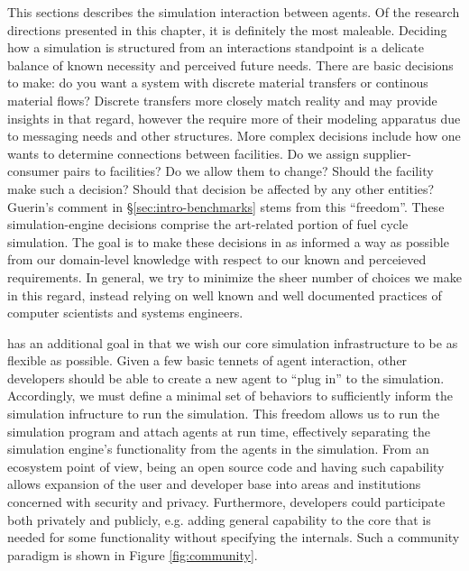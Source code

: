 This sections describes the simulation interaction between agents. Of the
research directions presented in this chapter, it is definitely the most
maleable. Deciding how a simulation is structured from an interactions
standpoint is a delicate balance of known necessity and perceived future
needs. There are basic decisions to make: do you want a system with discrete
material transfers or continous material flows? Discrete transfers more closely
match reality and may provide insights in that regard, however the require more
of their modeling apparatus due to messaging needs and other structures. More
complex decisions include how one wants to determine connections between
facilities. Do we assign supplier-consumer pairs to facilities? Do we allow them
to change? Should the facility make such a decision? Should that decision be
affected by any other entities? Guerin's comment in \S\ref{sec:intro-benchmarks}
stems from this ``freedom''. These simulation-engine decisions comprise the
art-related portion of fuel cycle simulation. The goal is to make these
decisions in as informed a way as possible from our domain-level knowledge with
respect to our known and perceieved requirements. In general, we try to minimize
the sheer number of choices we make in this regard, instead relying on well
known and well documented practices of computer scientists and systems
engineers.

\Cyclus has an additional goal in that we wish our core simulation
infrastructure to be as flexible as possible. Given a few basic tennets of agent
interaction, other developers should be able to create a new agent to ``plug
in'' to the simulation. Accordingly, we must define a minimal set of behaviors
to sufficiently inform the simulation infructure to run the simulation. This
freedom allows us to run the simulation program and attach agents at run time,
effectively separating the simulation engine's functionality from the agents in
the simulation. From an ecosystem point of view, being an open source code and
having such capability allows expansion of the user and developer base into
areas and institutions concerned with security and privacy. Furthermore,
developers could participate both privately and publicly, e.g. adding general
capability to the \Cyclus core that is needed for some functionality without
specifying the internals. Such a community paradigm is shown in Figure
\ref{fig:community}.

